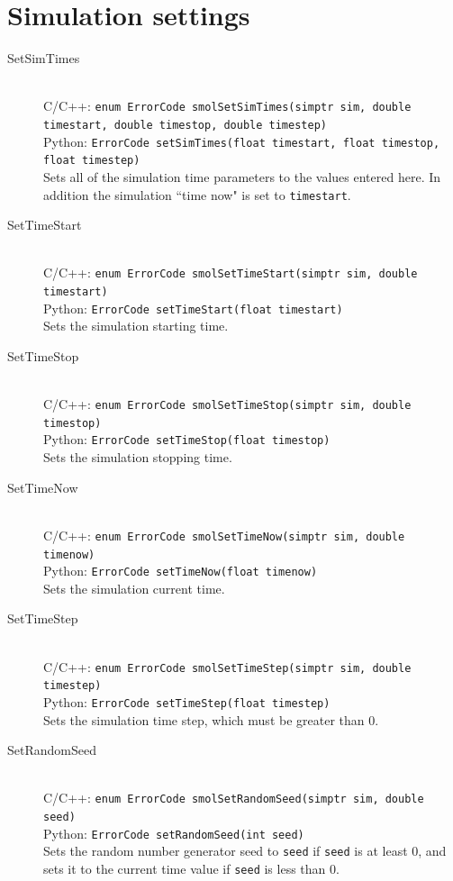 \documentclass {book}
\newcommand {\ttt} {\texttt}
\begin{document}
\section{Simulation settings}

\begin{description}

\item[SetSimTimes]
\hfill \\
C/C++: \ttt{enum ErrorCode smolSetSimTimes(simptr sim, double timestart, double timestop, double timestep)}\\
Python: \ttt{ErrorCode setSimTimes(float timestart, float timestop, float timestep)}\\
Sets all of the simulation time parameters to the values entered here. In addition the simulation ``time now" is set to \ttt{timestart}.

\item[SetTimeStart]
\hfill \\
C/C++: \ttt{enum ErrorCode smolSetTimeStart(simptr sim, double timestart)}\\
Python: \ttt{ErrorCode setTimeStart(float timestart)}\\
Sets the simulation starting time.

\item[SetTimeStop]
\hfill \\
C/C++: \ttt{enum ErrorCode smolSetTimeStop(simptr sim, double timestop)}\\
Python: \ttt{ErrorCode setTimeStop(float timestop)}\\
Sets the simulation stopping time.

\item[SetTimeNow]
\hfill \\
C/C++: \ttt{enum ErrorCode smolSetTimeNow(simptr sim, double timenow)}\\
Python: \ttt{ErrorCode setTimeNow(float timenow)}\\
Sets the simulation current time.

\item[SetTimeStep]
\hfill \\
C/C++: \ttt{enum ErrorCode smolSetTimeStep(simptr sim, double timestep)}\\
Python: \ttt{ErrorCode setTimeStep(float timestep)}\\
Sets the simulation time step, which must be greater than 0.

\item[SetRandomSeed]
\hfill \\
C/C++: \ttt{enum ErrorCode smolSetRandomSeed(simptr sim, double seed)}\\
Python: \ttt{ErrorCode setRandomSeed(int seed)}\\
Sets the random number generator seed to \ttt{seed} if \ttt{seed} is at least 0, and sets it to the current time value if \ttt{seed} is less than 0.


\end{description}
\end{document}
